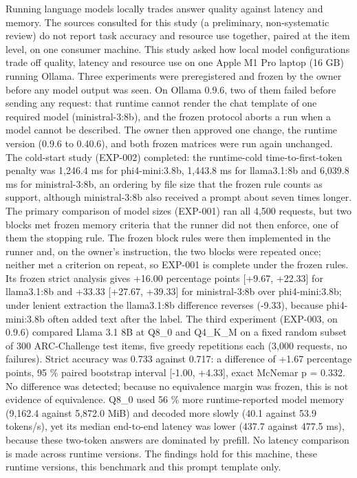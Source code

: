 \documentclass[
]{article}
\begin{document}
Running language models locally trades answer quality against latency
and memory. The sources consulted for this study (a preliminary,
non-systematic review) do not report task accuracy and resource use
together, paired at the item level, on one consumer machine. This study
asked how local model configurations trade off quality, latency and
resource use on one Apple M1 Pro laptop (16 GB) running Ollama. Three
experiments were preregistered and frozen by the owner before any model
output was seen. On Ollama 0.9.6, two of them failed before sending any
request: that runtime cannot render the chat template of one required
model (ministral-3:8b), and the frozen protocol aborts a run when a
model cannot be described. The owner then approved one change, the
runtime version (0.9.6 to 0.40.6), and both frozen matrices were run
again unchanged. The cold-start study (EXP-002) completed: the
runtime-cold time-to-first-token penalty was 1,246.4 ms for
phi4-mini:3.8b, 1,443.8 ms for llama3.1:8b and 6,039.8 ms for
ministral-3:8b, an ordering by file size that the frozen rule counts as
support, although ministral-3:8b also received a prompt about seven
times longer. The primary comparison of model sizes (EXP-001) ran all
4,500 requests, but two blocks met frozen memory criteria that the
runner did not then enforce, one of them the stopping rule. The frozen
block rules were then implemented in the runner and, on the owner's
instruction, the two blocks were repeated once; neither met a criterion
on repeat, so EXP-001 is complete under the frozen rules. Its frozen
strict analysis gives +16.00 percentage points {[}+9.67, +22.33{]} for
llama3.1:8b and +33.33 {[}+27.67, +39.33{]} for ministral-3:8b over
phi4-mini:3.8b; under lenient extraction the llama3.1:8b difference
reverses (-9.33), because phi4-mini:3.8b often added text after the
label. The third experiment (EXP-003, on 0.9.6) compared Llama 3.1 8B at
Q8\_0 and Q4\_K\_M on a fixed random subset of 300 ARC-Challenge test
items, five greedy repetitions each (3,000 requests, no failures).
Strict accuracy was 0.733 against 0.717: a difference of +1.67
percentage points, 95 \% paired bootstrap interval {[}-1.00, +4.33{]},
exact McNemar p = 0.332. No difference was detected; because no
equivalence margin was frozen, this is not evidence of equivalence.
Q8\_0 used 56 \% more runtime-reported model memory (9,162.4 against
5,872.0 MiB) and decoded more slowly (40.1 against 53.9 tokens/s), yet
its median end-to-end latency was lower (437.7 against 477.5 ms),
because these two-token answers are dominated by prefill. No latency
comparison is made across runtime versions. The findings hold for this
machine, these runtime versions, this benchmark and this prompt template
only.
\end{document}
